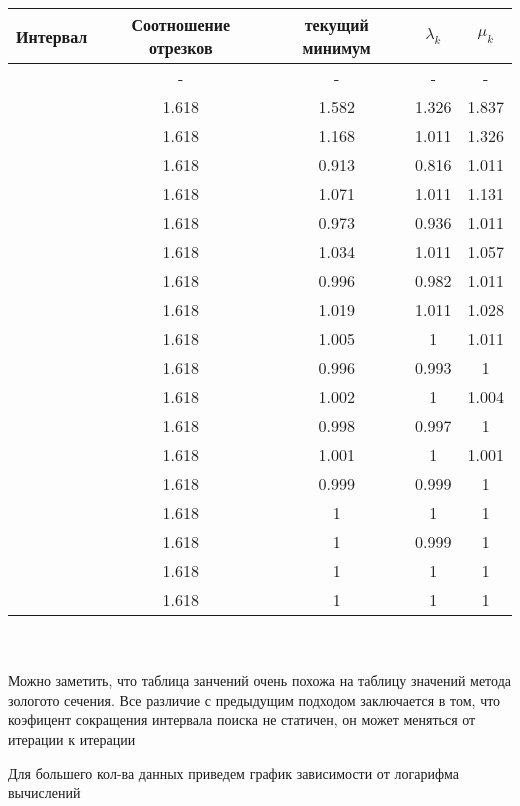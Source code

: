 \documentclass[a4paper, 14pt]{article}
\begin{document}
\begin{tabular}{|c |c| c| c| c|}
		\hline
		Интервал & Соотношение отрезков & текущий минимум & $\lambda_k$ & $\mu_k$\\
		\hline
		[0.5, 4] & - & -& - & - \\
		\hline
[0.5, 2.663] & 1.618 & 1.582 & 1.326 & 1.837\\
\hline
[0.5, 1.837] & 1.618 & 1.168 & 1.011 & 1.326\\
\hline
[0.5, 1.326] & 1.618 & 0.913 & 0.816 & 1.011\\
\hline
[0.816, 1.326] & 1.618 & 1.071 & 1.011 & 1.131\\
\hline
[0.816, 1.131] & 1.618 & 0.973 & 0.936 & 1.011\\
\hline
[0.936, 1.131] & 1.618 & 1.034 & 1.011 & 1.057\\
\hline
[0.936, 1.057] & 1.618 & 0.996 & 0.982 & 1.011\\
\hline
[0.982, 1.057] & 1.618 & 1.019 & 1.011 & 1.028\\
\hline
[0.982, 1.028] & 1.618 & 1.005 & 1 & 1.011\\
\hline
[0.982, 1.011] & 1.618 & 0.996 & 0.993 & 1\\
\hline
[0.993, 1.011] & 1.618 & 1.002 & 1 & 1.004\\
\hline
[0.993, 1.004] & 1.618 & 0.998 & 0.997 & 1\\
\hline
[0.997, 1.004] & 1.618 & 1.001 & 1 & 1.001\\
\hline
[0.997, 1.001] & 1.618 & 0.999 & 0.999 & 1\\
\hline
[0.999, 1.001] & 1.618 & 1 & 1 & 1\\
\hline
[0.999, 1] & 1.618 & 1 & 0.999 & 1\\
\hline
[0.999, 1] & 1.618 & 1 & 1 & 1\\
\hline
[1, 1] & 1.618 & 1 & 1 & 1\\
\hline
	\end{tabular} \\\\

 Можно заметить, что таблица занчений очень похожа на таблицу значений метода зологото сечения. Все различие с предыдущим подходом заключается в том, что коэфицент сокращения интервала поиска не статичен, он может меняться от итерации к итерации 
  
  Для большего кол-ва данных приведем график зависимости от логарифма вычислений
  
	
\end{document}
